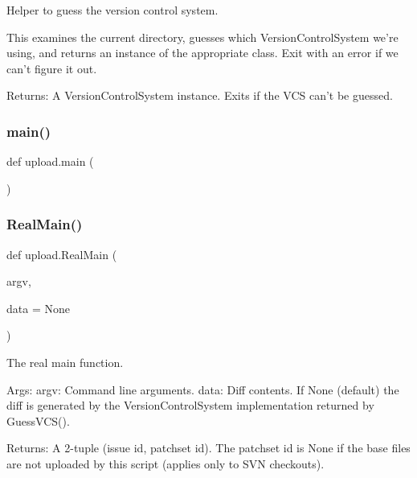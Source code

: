 \begin{DoxyVerb}Helper to guess the version control system.

This examines the current directory, guesses which VersionControlSystem
we're using, and returns an instance of the appropriate class.  Exit with an
error if we can't figure it out.

Returns:
  A VersionControlSystem instance. Exits if the VCS can't be guessed.
\end{DoxyVerb}
 \mbox{\label{namespaceupload_aef3fcf7a8d77d13ba75adbf58b6c43ee}} 
\subsubsection{\texorpdfstring{main()}{main()}}
{\footnotesize\ttfamily def upload.\+main (\begin{DoxyParamCaption}{ }\end{DoxyParamCaption})}

\mbox{\label{namespaceupload_ad6226af96c9f1905602b8002bd5de952}} 
\subsubsection{\texorpdfstring{RealMain()}{RealMain()}}
{\footnotesize\ttfamily def upload.\+Real\+Main (\begin{DoxyParamCaption}\item[{}]{argv,  }\item[{}]{data = {\ttfamily None} }\end{DoxyParamCaption})}

\begin{DoxyVerb}The real main function.

Args:
  argv: Command line arguments.
  data: Diff contents. If None (default) the diff is generated by
    the VersionControlSystem implementation returned by GuessVCS().

Returns:
  A 2-tuple (issue id, patchset id).
  The patchset id is None if the base files are not uploaded by this
  script (applies only to SVN checkouts).
\end{DoxyVerb}
 \mbox{\label{namespaceupload_adddc423c49132e8879cbb25d6be2cf11}} 
